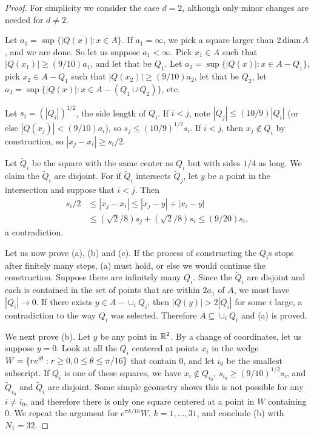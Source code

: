 \begin{proof}
For simplicity we consider the case $d = 2$, although only minor changes are needed for $d \neq 2$.

Let $a_1 = \sup\{|Q(x)| : x \in A\}$. If $a_1 = \infty$, we pick a square larger than $2\operatorname{diam} A$, and we are done. So let us suppose $a_1 < \infty$. Pick $x_1 \in A$ such that $|Q(x_1)| \geq (9/10)a_1$, and let that be $Q_1$. Let $a_2 = \sup\{|Q(x)| : x \in A - Q_1\}$, pick $x_2 \in A - Q_1$ such that $|Q(x_2)| \geq (9/10)a_2$, let that be $Q_2$, let $a_3 = \sup\{|Q(x)| : x \in A - (Q_1 \cup Q_2)\}$, etc.

Let $s_i = (|Q_i|)^{1/2}$, the side length of $Q_i$. If $i < j$, note $|Q_j| \leq (10/9)|Q_i|$ (or else $|Q(x_j)| < (9/10)a_i$), so $s_j \leq (10/9)^{1/2}s_i$. If $i < j$, then $x_j \notin Q_i$ by construction, so $|x_j - x_i| \geq s_i/2$.

Let $\widetilde{Q}_i$ be the square with the same center as $Q_i$ but with sides $1/4$ as long. We claim the $\widetilde{Q}_i$ are disjoint. For if $\widetilde{Q}_i$ intersects $\widetilde{Q}_j$, let $y$ be a point in the intersection and suppose that $i < j$. Then
\begin{align*}
    s_i/2 &\leq |x_j - x_i| \leq |x_j - y| + |x_i - y| \\
    &\leq (\sqrt{2}/8)s_j + (\sqrt{2}/8)s_i \leq (9/20)s_i,
\end{align*}
a contradiction.

Let us now prove (a), (b) and (c). If the process of constructing the $Q_i$s stops after finitely many steps, (a) must hold, or else we would continue the construction. Suppose there are infinitely many $Q_i$. Since the $\widetilde{Q}_i$ are disjoint and each is contained in the set of points that are within $2a_1$ of $A$, we must have $|Q_i| \to 0$. If there exists $y \in A - \cup_i Q_i$, then $|Q(y)| > 2|Q_i|$ for some $i$ large, a contradiction to the way $Q_i$ was selected. Therefore $A \subseteq \cup_i Q_i$ and (a) is proved.

We next prove (b). Let $y$ be any point in $\mathbb{R}^2$. By a change of coordinates, let us suppose $y = 0$. Look at all the $Q_i$ centered at points $x_i$ in the wedge $W = \{re^{\mathrm{i}\theta} : r \geq 0, 0 \leq \theta \leq \pi/16\}$ that contain $0$, and let $i_0$ be the smallest subscript. If $Q_i$ is one of these squares, we have $x_i \notin Q_{i_0}$, $s_{i_0} \geq \allowbreak (9/10)^{1/2}s_i$, and $\widetilde{Q}_{i_0}$ and $\widetilde{Q}_i$ are disjoint. Some simple geometry shows this is not possible for any $i \neq i_0$, and therefore there is only one square centered at a point in $W$ containing $0$. We repeat the argument for $e^{\pi k/16}W$, $k = 1,\ldots,31$, and conclude (b) with $N_1 = 32$.


\end{proof}
